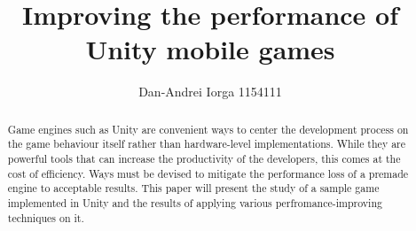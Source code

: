 \documentclass[sigconf]{acmart}
\begin{document}
\title[Unity Mobile Games]{Improving the performance of Unity mobile games}

\author{Dan-Andrei Iorga 1154111}


\renewcommand{\shortauthors}{A. Iorga}

\begin{abstract}
Game engines such as Unity are convenient ways to center the development process on the game behaviour itself rather than hardware-level implementations. While they are powerful tools that can increase the productivity of the developers, this comes at the cost of efficiency. Ways must be devised to mitigate the performance loss of a premade engine to acceptable results. This paper will present the study of a sample game implemented in Unity and the results of applying various perfromance-improving techniques on it.
\end{abstract}

%
%

\end{document}
